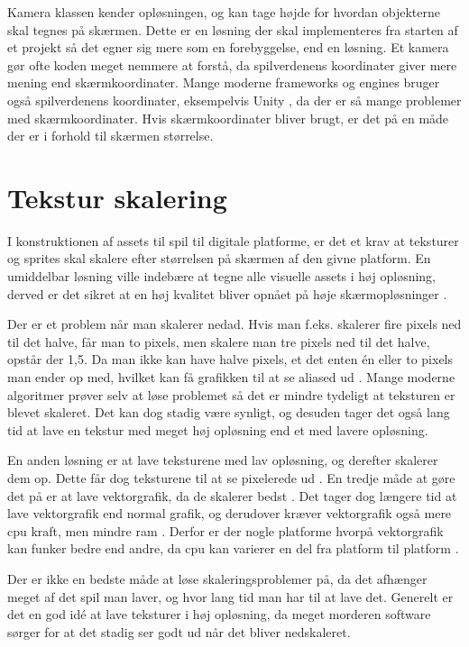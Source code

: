 \documentclass[Main.tex]{PositionOgSkalering}
\begin{document}
Kamera klassen kender opløsningen, og kan tage højde for hvordan objekterne skal tegnes på skærmen. Dette er en løsning der skal implementeres fra starten af et projekt så det egner sig mere som en forebyggelse, end en løsning. Et kamera gør ofte koden meget nemmere at forstå, da spilverdenens koordinater giver mere mening end skærmkoordinater. 
Mange moderne frameworks og engines bruger også spilverdenens koordinater, eksempelvis Unity \cite{unity3d}, da der er så mange problemer med skærmkoordinater. Hvis skærmkoordinater bliver brugt, er det på en måde der er i forhold til skærmen størrelse.

\begin{figure}[ht]
\lstset{numbers=left, language=[Sharp]C}

\end{figure}


\section{Tekstur skalering}

I konstruktionen af assets til spil til digitale platforme, er det et krav at teksturer og sprites skal skalere efter størrelsen på skærmen af den givne platform. En umiddelbar løsning ville indebære at tegne alle visuelle assets i høj opløsning, derved er det sikret at en høj kvalitet bliver opnået på høje skærmopløsninger \cite{deepworldgame}.

Der er et problem når man skalerer nedad. Hvis man f.eks. skalerer fire pixels ned til det halve, får man to pixels, men skalere man tre pixels ned til det halve, opstår der 1,5. Da man ikke kan have halve pixels, et det enten én eller to pixels man ender op med, hvilket kan få grafikken til at se aliased ud \cite{Martin}. Mange moderne algoritmer prøver selv at løse problemet så det er mindre tydeligt at teksturen er blevet skaleret.\cite{Kopf} Det kan dog stadig være synligt, og desuden tager det også lang tid at lave en tekstur med meget høj opløsning end et med lavere opløsning.

En anden løsning er at lave teksturene med lav opløsning, og derefter skalerer dem op. Dette får dog teksturene til at se pixelerede ud \cite{McHugh}.
En tredje måde at gøre det på er at lave vektorgrafik, da de skalerer bedst \cite{deepworldgame}. Det tager dog længere tid at lave vektorgrafik end normal grafik,\cite{deepworldgame} og derudover kræver vektorgrafik også mere cpu kraft, men mindre ram \cite{deepworldgame}. Derfor er der nogle platforme hvorpå vektorgrafik kan funker bedre end andre, da cpu kan varierer en del fra platform til platform \cite{PassMark}.

Der er ikke en bedste måde at løse skaleringsproblemer på, da det afhænger meget af det spil man laver, og hvor lang tid man har til at lave det. Generelt er det en god idé at lave teksturer i høj opløsning, da meget morderen software sørger for at det stadig ser godt ud når det bliver nedskaleret.
\end{document}
